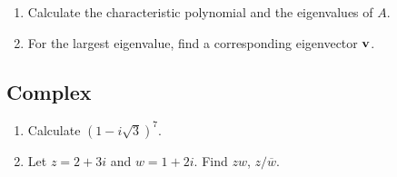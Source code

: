 \documentclass[11pt]{amsart}
\begin{document}
\begin{enumerate}
\item Calculate the characteristic polynomial and the eigenvalues of $A$.
\item For the largest eigenvalue, find a corresponding eigenvector ${\bf v}$.
\end{enumerate}


\subsection{Complex}
\begin{enumerate}
\item Calculate $(1 - i\sqrt{3})^7$.
\item Let $z = 2+3i$ and $w = 1+ 2i$.  Find $zw$, $z/\overline{w}$.
\end{enumerate}
\end{document}
